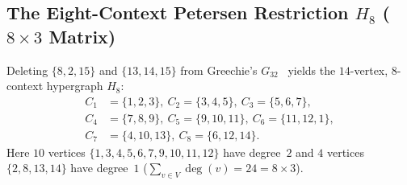 \documentclass[aps,pra,reprint,superscriptaddress,longbibliography,nofootinbib,floatfix,10pt]{revtex4-2}
\theoremstyle{definition}\newtheorem{definition}[theorem]{Definition}
\theoremstyle{remark}\newtheorem{remark}[theorem]{Remark}
\begin{document}
\subsection{The Eight-Context Petersen Restriction \texorpdfstring{$H_8$}{H8} (\texorpdfstring{$8\times 3$}{8x3} Matrix)}\label{sec:H8}

Deleting $\{8,2,15\}$ and $\{13,14,15\}$ from Greechie's $G_{32}$~\cite{greechie:71} yields the $14$-vertex, $8$-context hypergraph $H_8$:
\begin{equation}\label{eq:H8-contexts}
\begin{aligned}
C_1&=\{1,2,3\},\ C_2=\{3,4,5\},\ C_3=\{5,6,7\},\\
C_4&=\{7,8,9\},\ C_5=\{9,10,11\},\ C_6=\{11,12,1\},\\
C_7&=\{4,10,13\},\ C_8=\{6,12,14\}.
\end{aligned}
\end{equation}
Here $10$ vertices $\{1,3,4,5,6,7,9,10,11,12\}$ have degree~$2$ and $4$ vertices $\{2,8,13,14\}$ have degree~$1$ ($\sum_{v\in V}\deg(v)=24=8\times 3$).
\end{document}
